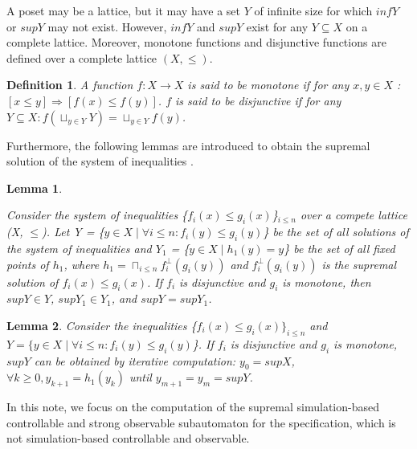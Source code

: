 \documentclass[12pt,draftcls,onecolumn]{IEEEtran}
\newtheorem{Lemma}{Lemma}
\newtheorem{Definition}{Definition}
\begin{document}
A poset may be a lattice, but it may have a set $Y$ of infinite
size for which $infY$ or $supY$ may not exist. However, $infY$ and
$supY$ exist for any $Y \subseteq X$ on a complete lattice.
Moreover, monotone functions and disjunctive functions are defined
over a complete lattice $(X, \leq)$.

\begin{Definition}
A function $f : X \rightarrow X$ is said to be monotone if for any
$x, y \in X$ : $[x \leq y] \Rightarrow [f(x) \leq f(y)]$. $f$ is
said to be disjunctive if for any $Y \subseteq X : f(\sqcup_{y \in
Y}Y) = \sqcup_{y \in Y} f(y)$.
\end{Definition}




Furthermore, the following lemmas are introduced to obtain the
supremal solution of the system of inequalities \cite{kb}.

\begin{Lemma}\label{l1}

Consider the system of inequalities \{$f_{i}(x) \leq
g_{i}(x)$\}$_{i \leq n}$ over a compete lattice (X, $\leq$). Let Y
= \{$y \in X \mid \forall i \leq n: f_{i}(y) \leq g_{i}(y)$\} be
the set of all solutions of the system of inequalities and $Y_{1}$
= \{$y \in X \mid h_{1}(y) = y$\} be the set of all fixed points
of $h_{1}$, where $h_{1} = \sqcap_{i \leq
n}f_{i}^{\bot}(g_{i}(y))$ and $f_{i}^{\bot}(g_{i}(y))$ is the
supremal solution of $f_{i}(x) \leq g_{i}(x)$. If $f_{i}$ is
disjunctive and $g_{i}$ is monotone, then $supY \in Y$, $supY_{1}
\in Y_{1}$, and $supY = supY_{1}$.
\end{Lemma}





\begin{Lemma}\label{l2}
Consider the inequalities \{$f_{i}(x) \leq g_{i}(x)\}_{i \leq n}$
and $Y = \{ y \in X \mid \forall i \leq n: f_{i}(y) \leq
g_{i}(y)$\}. If $f_{i}$ is disjunctive and $g_{i}$ is monotone,
$supY$ can be obtained by iterative computation: $y_{0} = sup X$,
$\forall k \geq 0, y_{k+1} = h_{1}(y_{k})$ until $y_{m+1} = y_m =
supY$.



\end{Lemma}


In this note, we focus on the computation of the supremal
simulation-based controllable and strong observable subautomaton
for the specification, which is not simulation-based controllable
and observable.
\end{document}
